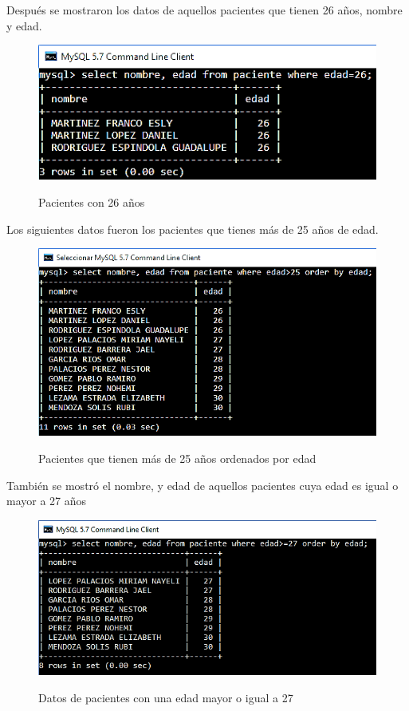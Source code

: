 \documentclass[12pt, titlepage]{article}
\begin{document}
	Después se mostraron los datos de aquellos pacientes que tienen 26 años, nombre y edad.
	\begin{figure}[H]
		\begin{center}
			\includegraphics[width=\textwidth]{img/cuatro.png}
			\label{fig:cuatro}
			\caption{Pacientes con 26 años}
		\end{center}
	\end{figure}
	Los siguientes datos fueron los pacientes que tienes más de 25 años de edad.
	\begin{figure}[H]
		\begin{center}
			\includegraphics[width=\textwidth]{img/cinco.png}
			\label{fig:cinco}
			\caption{Pacientes que tienen más de 25 años ordenados por edad}
		\end{center}
	\end{figure}
	También se mostró el nombre, y edad de aquellos pacientes cuya edad es igual o mayor a 27 años
	\begin{figure}[H]
		\begin{center}
			\includegraphics[width=\textwidth]{img/seis.png}
			\label{fig:seis}
			\caption{Datos de pacientes con una edad mayor o igual a 27}
		\end{center}
	\end{figure}
\end{document}
